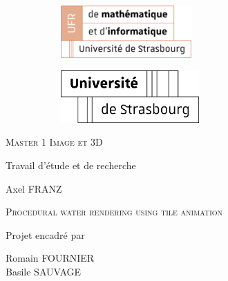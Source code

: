 
\begin{center}
\begin{figure}[H]
    \centering
    \begin{subfigure}[b]{0.48\linewidth}
        \centering
        \includegraphics[height=2cm, keepaspectratio]{images/UFR.png}
    \end{subfigure}
    \hfill
    \begin{subfigure}[b]{0.48\linewidth}
        \centering
        \includegraphics[height=2cm, keepaspectratio]{images/images.png}
    \end{subfigure}
\end{figure}

    \vfill

    {
	\large
	\textsc{
	       Master 1 Image et 3D
	}
    }

    \bigskip\bigskip
    \bigskip\bigskip

    {\huge Travail d'étude et de recherche}

    \bigskip\bigskip

    
    {\large Axel \textsc{FRANZ}}
    
    \vfill

    {
	\huge
	\textsc{
	    Procedural water rendering using tile animation
	}
    }

    \vfill
    \vfill

    \vfill

    {\large Projet encadré par}

    \medskip

    {\large Romain \textsc{FOURNIER}}
    \\
    {\large Basile \textsc{SAUVAGE}}

    \bigskip

    \bigskip

\end{center}


\newpage